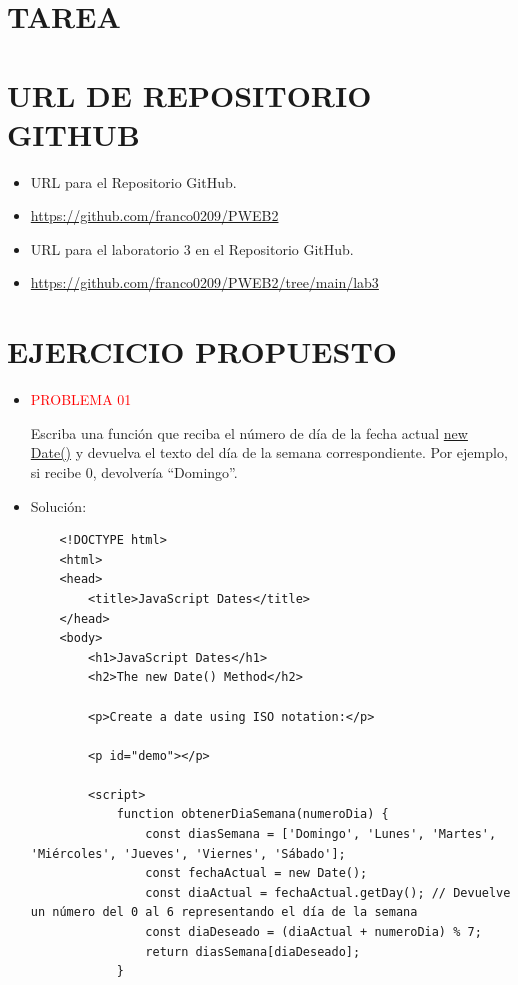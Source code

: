 \documentclass{article}
\begin{document}
    \section{TAREA}
	\begin{itemize}	

    \section{URL DE REPOSITORIO GITHUB}
	\begin{itemize}
		\item URL para el Repositorio GitHub.
		\item \url{https://github.com/franco0209/PWEB2}
		\item URL para el laboratorio 3 en el Repositorio GitHub.	
        \item \url{https://github.com/franco0209/PWEB2/tree/main/lab3}
	\end{itemize}
    \section{EJERCICIO PROPUESTO}
\begin{itemize}
    \item \textcolor{red}{PROBLEMA 01}
    
    Escriba una función que reciba el número de día de la fecha actual \href{https://www.w3schools.com/jsref/jsref_obj_date.asp}{new Date()} y devuelva el texto del día de la semana correspondiente. Por ejemplo, si recibe 0, devolvería “Domingo”.
    
    \item Solución:
    \begin{verbatim}
    <!DOCTYPE html>
    <html>
    <head>
        <title>JavaScript Dates</title>
    </head>
    <body>
        <h1>JavaScript Dates</h1>
        <h2>The new Date() Method</h2>

        <p>Create a date using ISO notation:</p>

        <p id="demo"></p>

        <script>
            function obtenerDiaSemana(numeroDia) {
                const diasSemana = ['Domingo', 'Lunes', 'Martes', 'Miércoles', 'Jueves', 'Viernes', 'Sábado'];
                const fechaActual = new Date();
                const diaActual = fechaActual.getDay(); // Devuelve un número del 0 al 6 representando el día de la semana
                const diaDeseado = (diaActual + numeroDia) % 7;
                return diasSemana[diaDeseado];
            }


\end{verbatim}
\end{itemize}
\end{itemize}
\end{document}
